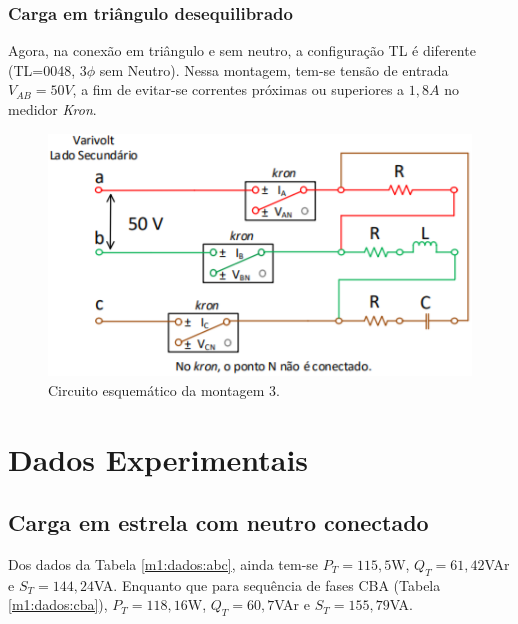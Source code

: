 \documentclass[a4paper,12pt,oneside,openany,table,xcdraw]{article}
\begin{document}
\subsubsection{Carga em triângulo desequilibrado} \label{m3:montagem}
Agora, na conexão em triângulo e sem neutro, a configuração TL é diferente (TL=0048, $3\phi$ sem Neutro). Nessa montagem, tem-se tensão de entrada $V_{AB}=50V$, a fim de evitar-se correntes próximas ou superiores a $1,8A$ no medidor \emph{Kron}. 

\vspace{0.15cm}
\begin{figure}[H]
\centering
\includegraphics[width=13cm]{m3-circuito}
\caption{Circuito esquemático da montagem 3.}
\label{m3:esquema}
\end{figure}
\vspace{0.2cm}

\section{Dados Experimentais}

\subsection{Carga em estrela com neutro conectado} \label{m1:dados}
Dos dados da Tabela \ref{m1:dados:abc}, ainda tem-se $P_T = 115,5$W, $Q_T = 61,42$VAr e $S_T = 144,24$VA. Enquanto que para sequência de fases CBA (Tabela \ref{m1:dados:cba}), $P_T = 118,16$W, $Q_T = 60,7$VAr e $S_T = 155,79$VA.
\end{document}
